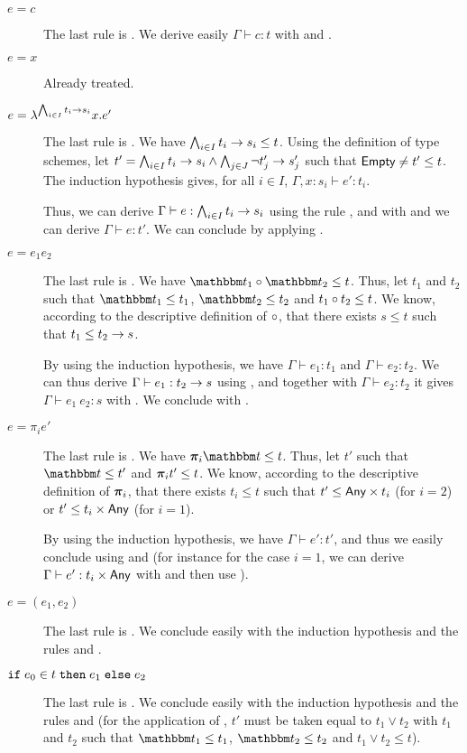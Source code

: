 \documentclass[a4paper]{article}
\theoremstyle{definition}
\begin{document}
  \begin{description}
    \item[$e=c$] The last rule is . We derive easily $\Gamma \vdash c:t$ with  and .
    \item[$e=x$] Already treated.
    \item[$e=\lambda^{\bigwedge_{i\in I} t_i\to s_i}x.e'$]
    The last rule is .
    We have $\bigwedge_{i\in I} t_i\to s_i \leq t$.
    Using the definition of type schemes, let $t'=\bigwedge_{i\in I} t_i\to s_i \land \bigwedge_{j\in J} \neg t'_j\to s'_j$ such that $\textsf{Empty} \neq t' \leq t$.
    The induction hypothesis gives, for all $i\in I$, $\Gamma,x:s_i\vdash e':t_i$.
    
    Thus, we can derive $\Gamma\vdash e:\bigwedge_{i\in I} t_i\to s_i$ using the rule , and with  and
     we can derive $\Gamma\vdash e:t'$. We can conclude by applying .
    \item[$e=e_1 e_2$] The last rule is .
    We have $\apply {\ts_1} {\ts_2} \leq t$. Thus, let $t_1$ and $t_2$ such that $\ts_1 \leq t_1$, $\ts_2 \leq t_2$ and $t_1\circ t_2 \leq t$.
    We know, according to the descriptive definition of $\circ$, that there exists $s\leq t$ such that $t_1 \leq t_2\to s$.

    By using the induction hypothesis, we have $\Gamma\vdash e_1:t_1$ and $\Gamma\vdash e_2:t_2$. We can thus derive
    $\Gamma\vdash e_1:t_2\to s$ using , and together with $\Gamma\vdash e_2:t_2$ it gives
    $\Gamma\vdash e_1\ e_2:s$ with . We conclude with .

    \item[$e=\pi_i e'$] The last rule is . We have $\bpi_i \ts \leq t$. Thus, let $t'$ such that $\ts \leq t'$ and $\boldsymbol{\pi}_i t' \leq t$.
    We know, according to the descriptive definition of $\boldsymbol{\pi}_i$, that there exists $t_i\leq t$ such that $t' \leq \textsf{Any}\times t_i$ (for $i=2$) or $t' \leq t_i\times \textsf{Any}$ (for $i=1$).
    
    By using the induction hypothesis, we have $\Gamma\vdash e':t'$, and thus we easily conclude using  and 
    (for instance for the case $i=1$, we can derive $\Gamma\vdash e':t_i\times \textsf{Any}$ with  and then use ).

    \item[$e=(e_1,e_2)$] The last rule is . We conclude easily with the induction hypothesis and the rules  and .

    \item[$\texttt{if}\;e_0\in t\;\texttt{then}\;e_1\;\texttt{else}\;e_2$] The last rule is . We conclude easily with the induction hypothesis and the rules
     and  (for the application of , $t'$ must be taken equal to $t_1 \vee t_2$ with $t_1$ and $t_2$ such that $\ts_1\leq t_1$, $\ts_2\leq t_2$ and $t_1 \vee t_2 \leq t$).
  \end{description}\ \\
\end{document}
